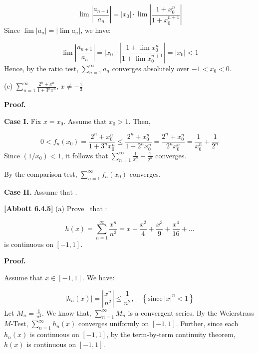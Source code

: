 \documentclass[10pt]{article}
\begin{document}
\begin{equation*}
\lim \left| \frac{a_{n+1}}{a_{n}}\right| =|x_{0} |\cdot \lim \left| \frac{1+x_{0}^{n}}{1+x_{0}^{n+1}}\right| 
\end{equation*}
Since $\displaystyle \lim $$\displaystyle |a_{n} |=|\lim a_{n} |$, we have:


\begin{equation*}
\lim \left| \frac{a_{n+1}}{a_{n}}\right| =|x_{0} |\cdot \left| \frac{1+\lim x_{0}^{n}}{1+\lim x_{0}^{n+1}}\right| =|x_{0} |< 1
\end{equation*}
Hence, by the ratio test, $\displaystyle \sum _{n=1}^{\infty } a_{n}$ converges absolutely over $\displaystyle -1< x_{0} < 0$.



(c) $\displaystyle \sum _{n=1}^{\infty }\frac{2^{n} +x^{n}}{1+3^{n} x^{n}}$, $\displaystyle x\neq -\frac{1}{3}$



\textbf{Proof.}



\textbf{Case I. }Fix $\displaystyle x=x_{0}$. Assume that $\displaystyle x_{0}  >1$. Then, \ 


\begin{equation*}
0< f_{n}( x_{0}) =\frac{2^{n} +x_{0}^{n}}{1+3^{n} x_{0}^{n}} \leq \frac{2^{n} +x_{0}^{n}}{1+2^{n} x_{0}^{n}} =\frac{2^{n} +x_{0}^{n}}{2^{n} x_{0}^{n}} =\frac{1}{x_{0}^{n}} +\frac{1}{2^{n}}
\end{equation*}
Since $\displaystyle ( 1/x_{0}) < 1$, it follows that $\displaystyle \sum _{n=1}^{\infty }\frac{1}{x_{0}^{n}} +\frac{1}{2^{n}}$ converges. 

By the comparison test, $\displaystyle \sum _{n=1}^{\infty } f_{n}( x_{0})$ converges.

\textbf{Case II. }Assume that $ $.



\textbf{[Abbott 6.4.5]} (a) Prove \ that :


\begin{equation*}
h( x) =\sum _{n=1}^{\infty }\frac{x^{n}}{n^{2}} =x+\frac{x^{2}}{4} +\frac{x^{3}}{9} +\frac{x^{4}}{16} +\dotsc 
\end{equation*}
is continuous on $\displaystyle [ -1,1]$. 



\textbf{Proof.}



Assume that $\displaystyle x\in [ -1,1]$. We have:


\begin{equation*}
|h_{n}( x) |=\left| \frac{x^{n}}{n^{2}}\right| \leq \frac{1}{n^{2}} ,\quad \left\{\text{since} \ |x|^{n} < 1\right\}
\end{equation*}
Let $\displaystyle M_{n} =\frac{1}{n^{2}}$. We know that, $\displaystyle \sum _{n=1}^{\infty } M_{n}$ is a convergent series. By the Weierstrass $\displaystyle M$-Test, $\displaystyle \sum _{n=1}^{\infty } h_{n}( x)$ converges uniformly on $\displaystyle [ -1,1]$. Further, since each $\displaystyle h_{n}( x)$ is continuous on $\displaystyle [ -1,1]$, by the term-by-term continuity theorem, $\displaystyle h( x)$ is continuous on $\displaystyle [ -1,1]$.
\end{document}
